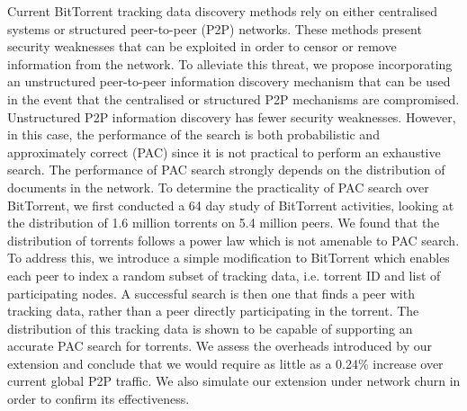 Current BitTorrent tracking data discovery methods rely on either centralised systems or structured peer-to-peer (P2P) networks. These methods present security weaknesses that can be exploited in order to censor or remove information from the network. To alleviate this threat, we propose incorporating an unstructured peer-to-peer information discovery mechanism that can be used in the event that the centralised or structured P2P mechanisms are compromised. Unstructured P2P information discovery has fewer security weaknesses. However, in this case, the performance of the search is both probabilistic and approximately correct (PAC) since it is not practical to perform an exhaustive search. The performance of PAC search strongly depends on the distribution of documents in the network. To determine the practicality of PAC search over BitTorrent, we first conducted a 64 day study of BitTorrent activities, looking at the distribution of 1.6 million torrents on 5.4 million peers. We found that the distribution of torrents follows a power law which is not amenable to PAC search. To address this, we introduce a simple modification to BitTorrent which enables each peer to index a random subset of tracking data, i.e. torrent ID and list of participating nodes. A successful search is then one that finds a peer with tracking data, rather than a peer directly participating in the torrent. The distribution of this tracking data is shown to be capable of supporting an accurate PAC search for torrents. We assess the overheads introduced by our extension and conclude that we would require as little as a 0.24\% increase over current global P2P traffic. We also simulate our extension under network churn in order to confirm its effectiveness.